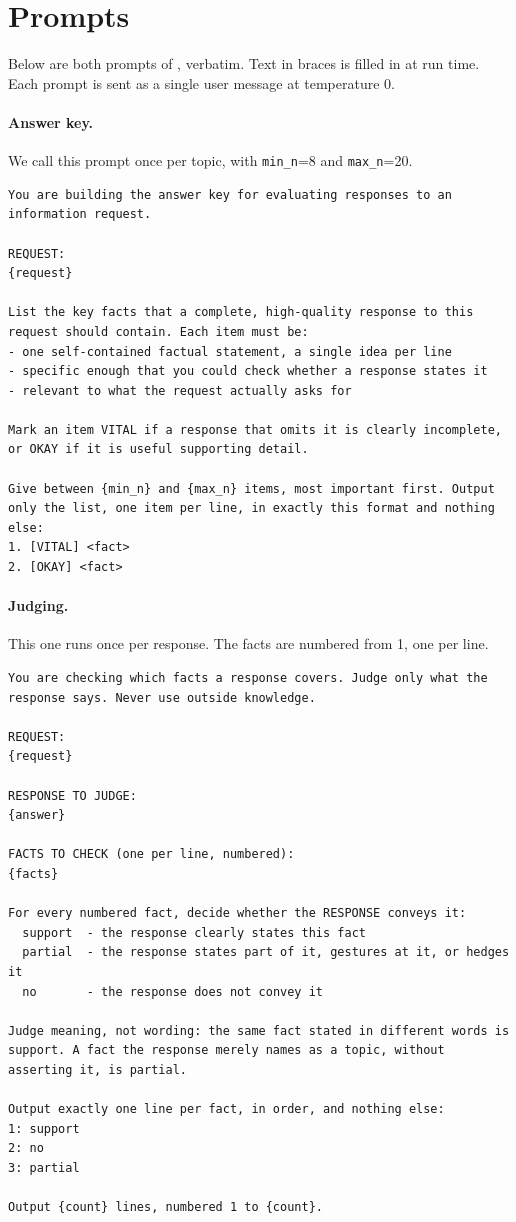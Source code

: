\section{Prompts}
\label{app:prompts}

Below are both prompts of , verbatim. Text in braces is filled
in at run time. Each prompt is sent as a single user message at temperature 0.

\paragraph{Answer key.} We call this prompt once per topic, with \texttt{min\_n}=8
and \texttt{max\_n}=20.
\begin{lstlisting}
You are building the answer key for evaluating responses to an information request.

REQUEST:
{request}

List the key facts that a complete, high-quality response to this request should contain. Each item must be:
- one self-contained factual statement, a single idea per line
- specific enough that you could check whether a response states it
- relevant to what the request actually asks for

Mark an item VITAL if a response that omits it is clearly incomplete, or OKAY if it is useful supporting detail.

Give between {min_n} and {max_n} items, most important first. Output only the list, one item per line, in exactly this format and nothing else:
1. [VITAL] <fact>
2. [OKAY] <fact>
\end{lstlisting}

\paragraph{Judging.} This one runs once per response. The facts are numbered from 1,
one per line.
\begin{lstlisting}
You are checking which facts a response covers. Judge only what the response says. Never use outside knowledge.

REQUEST:
{request}

RESPONSE TO JUDGE:
{answer}

FACTS TO CHECK (one per line, numbered):
{facts}

For every numbered fact, decide whether the RESPONSE conveys it:
  support  - the response clearly states this fact
  partial  - the response states part of it, gestures at it, or hedges it
  no       - the response does not convey it

Judge meaning, not wording: the same fact stated in different words is support. A fact the response merely names as a topic, without asserting it, is partial.

Output exactly one line per fact, in order, and nothing else:
1: support
2: no
3: partial

Output {count} lines, numbered 1 to {count}.
\end{lstlisting}

